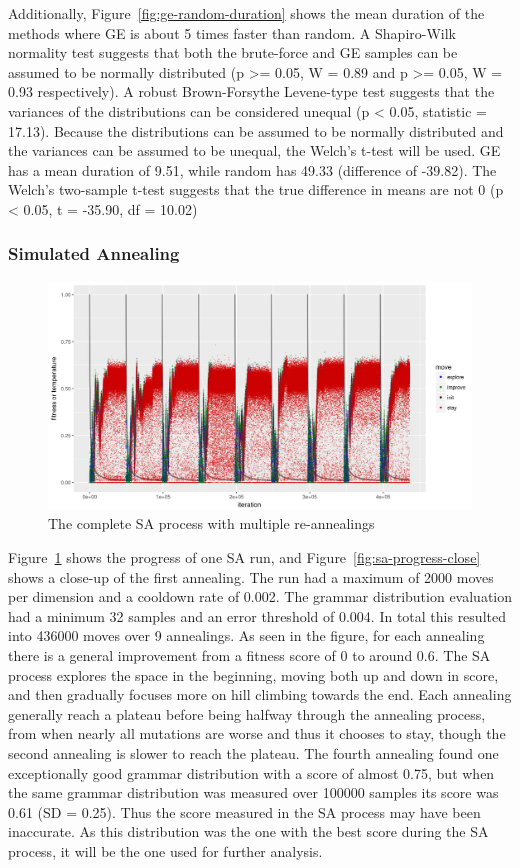Additionally, Figure~\ref{fig:ge-random-duration} shows the mean duration of the methods where GE is about 5 times faster than random.
A Shapiro-Wilk normality test suggests that both the brute-force and GE samples can be assumed to be normally distributed (p >= 0.05, W = 0.89 and p >= 0.05, W = 0.93 respectively).
A robust Brown-Forsythe Levene-type test suggests that the variances of the distributions can be considered unequal (p < 0.05, statistic = 17.13).
Because the distributions can be assumed to be normally distributed and the variances can be assumed to be unequal, the Welch's t-test will be used.
GE has a mean duration of 9.51, while random has 49.33 (difference of -39.82).
The Welch's two-sample t-test suggests that the true difference in means are not 0 (p < 0.05, t = -35.90, df = 10.02)

\subsubsection{Simulated Annealing}
\begin{figure}
    \includegraphics[width=\textwidth]{figures/sa-progress}
    \caption{The complete SA process with multiple re-annealings}
    \label{fig:sa-progress}
\end{figure}

Figure~\ref{fig:sa-progress} shows the progress of one SA run, and Figure~\ref{fig:sa-progress-close} shows a close-up of the first annealing.
The run had a maximum of 2000 moves per dimension and a cooldown rate of 0.002.
The grammar distribution evaluation had a minimum 32 samples and an error threshold of 0.004.
In total this resulted into 436000 moves over 9 annealings.
As seen in the figure, for each annealing there is a general improvement from a fitness score of 0 to around 0.6.
The SA process explores the space in the beginning, moving both up and down in score, and then gradually focuses more on hill climbing towards the end.
Each annealing generally reach a plateau before being halfway through the annealing process, from when nearly all mutations are worse and thus it chooses to stay, though the second annealing is slower to reach the plateau.
The fourth annealing found one exceptionally good grammar distribution with a score of almost 0.75, but when the same grammar distribution was measured over 100000 samples its score was 0.61 (SD = 0.25).
Thus the score measured in the SA process may have been inaccurate.
As this distribution was the one with the best score during the SA process, it will be the one used for further analysis.

